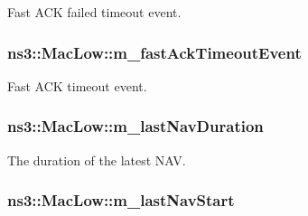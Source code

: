 Fast A\+CK failed timeout event. 

\subsubsection[{\texorpdfstring{m\+\_\+fast\+Ack\+Timeout\+Event}{m_fastAckTimeoutEvent}}]{ ns3\+::\+Mac\+Low\+::m\+\_\+fast\+Ack\+Timeout\+Event\hspace{0.3cm}{\ttfamily [private]}}\hypertarget{classns3_1_1MacLow_a0340164f4b7e73f93bcd618d238cd54c}{}\label{classns3_1_1MacLow_a0340164f4b7e73f93bcd618d238cd54c}


Fast A\+CK timeout event. 

\subsubsection[{\texorpdfstring{m\+\_\+last\+Nav\+Duration}{m_lastNavDuration}}]{ ns3\+::\+Mac\+Low\+::m\+\_\+last\+Nav\+Duration\hspace{0.3cm}{\ttfamily [private]}}\hypertarget{classns3_1_1MacLow_a939a71bf7296a87bfc5bf2eb8b026b4b}{}\label{classns3_1_1MacLow_a939a71bf7296a87bfc5bf2eb8b026b4b}


The duration of the latest N\+AV. 

\subsubsection[{\texorpdfstring{m\+\_\+last\+Nav\+Start}{m_lastNavStart}}]{ ns3\+::\+Mac\+Low\+::m\+\_\+last\+Nav\+Start\hspace{0.3cm}{\ttfamily [private]}}\hypertarget{classns3_1_1MacLow_ad306264b6f7c07d8b222d461f2d09b29}{}\label{classns3_1_1MacLow_ad306264b6f7c07d8b222d461f2d09b29}


